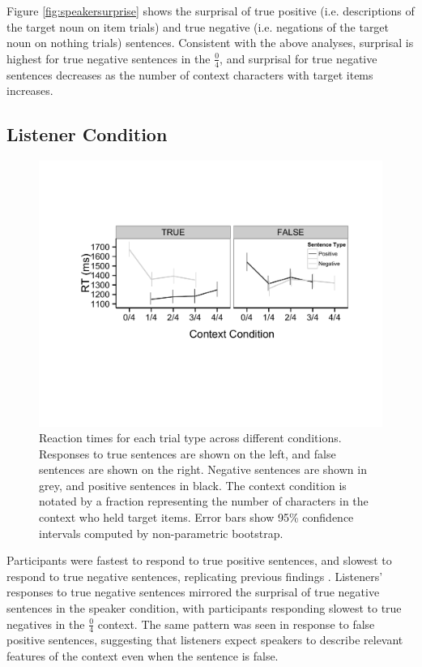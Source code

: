 \documentclass[man, noapacite]{apa2}
\begin{document}
Figure \ref{fig:speakersurprise} shows the surprisal of true positive (i.e. descriptions of the target noun on item trials) and true negative (i.e. negations of the target noun on nothing trials) sentences.  Consistent with the above analyses, surprisal is highest for true negative sentences in the $\frac{0}{4}$, and surprisal for true negative sentences decreases as the number of context characters with target items increases.

\subsection{Listener Condition}

\begin{figure}[t]
\begin{center} 
\includegraphics[width=4.5in]{figures/rts.pdf}
\caption{\label{fig:e2line} Reaction times for each trial type across different conditions. Responses to true sentences are shown on the left, and false sentences are shown on the right.  Negative sentences are shown in grey, and positive sentences in black.  The context condition is notated by a fraction representing the number of characters in the context who held target items. Error bars show 95\% confidence intervals computed by non-parametric bootstrap.}
\end{center} 
\end{figure}

Participants were fastest to respond to true positive sentences, and slowest to respond to true negative sentences, replicating previous findings \cite{hclark1972}.  Listeners' responses to true negative sentences mirrored the surprisal of true negative sentences in the speaker condition, with participants responding slowest to true negatives in the $\frac{0}{4}$ context.  The same pattern was seen in response to false positive sentences, suggesting that listeners expect speakers to describe relevant features of the context even when the sentence is false.  
\end{document}
